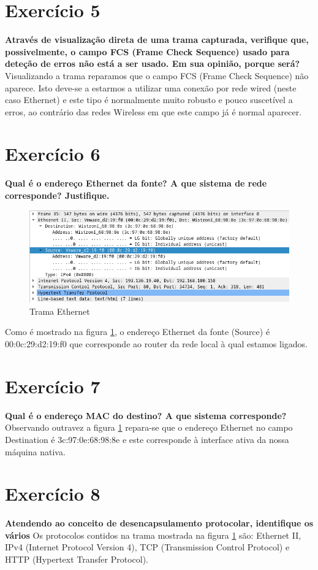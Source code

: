 \documentclass[a4paper]{report}
\begin{document}
\section{Exercício 5}
\textbf{Através de visualização direta de uma trama capturada, verifique que,
possivelmente, o campo FCS (Frame Check Sequence) usado para deteção de erros
não está a ser usado. Em sua opinião, porque será?}
Visualizando a trama reparamos que o campo FCS (Frame Check Sequence) não
aparece. Isto deve-se a estarmos a utilizar uma conexão por rede wired (neste
caso Ethernet) e este tipo é normalmente muito robusto e pouco suscetível a
erros, ao contrário das redes Wireless em que este campo já é normal aparecer.

\section{Exercício 6}
\textbf{Qual é o endereço Ethernet da fonte? A que sistema de rede corresponde?
Justifique.}

\begin{figure}[H]
    \centering 
    \includegraphics[width=\textwidth]{images/678.png}
    \caption{Trama Ethernet}
    \label{fig:678}
\end{figure}
Como é mostrado na figura \ref{fig:678}, o endereço Ethernet da fonte (Source) é
00:0c:29:d2:19:f0 que corresponde ao router da rede local à qual estamos
ligados.

\section{Exercício 7}
\textbf{Qual é o endereço MAC do destino? A que sistema corresponde?}
Observando outravez a figura \ref{fig:678} repara-se que o endereço Ethernet
no campo Destination é 3c:97:0e:68:98:8e e este corresponde à interface ativa da
nossa máquina nativa.

\section{Exercício 8}
\textbf{Atendendo ao conceito de desencapsulamento protocolar, identifique os
vários}
Os protocolos contidos na trama mostrada na figura \ref{fig:678} são: Ethernet
II, IPv4 (Internet Protocol Version 4), TCP (Transmission Control Protocol) e
HTTP (Hypertext Transfer Protocol).
\end{document}
